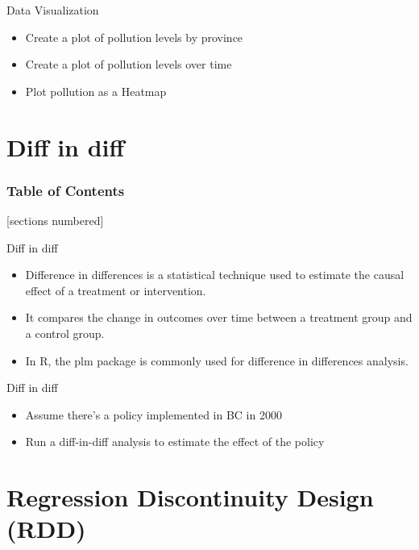 \documentclass[serif, 9pt, aspectratio=32]{beamer}
\begin{document}
\begin{frame}{Data Visualization}
    \begin{itemize}
        \setlength{\itemsep}{3em}
        \item Create a plot of pollution levels by province
        \item Create a plot of pollution levels over time
        \item Plot pollution as a Heatmap
    \end{itemize}
\end{frame}

\section{Diff in diff}

\begin{frame}
    \frametitle{Table of Contents}
    [sections numbered]
    \tableofcontents[currentsection]
\end{frame}

\begin{frame}{Diff in diff}
    \begin{itemize}
        \setlength{\itemsep}{3em}
        \item Difference in differences is a statistical technique used to estimate the causal effect of a treatment or intervention.
        \item It compares the change in outcomes over time between a treatment group and a control group.
        \item In R, the plm package is commonly used for difference in differences analysis.
    \end{itemize}
\end{frame}

\begin{frame}{Diff in diff}
    \begin{itemize}
        \setlength{\itemsep}{3em}
        \item Assume there's a policy implemented in BC in 2000
        \item Run a diff-in-diff analysis to estimate the effect of the policy
    \end{itemize}
\end{frame}

\section{Regression Discontinuity Design (RDD)}
\end{document}
